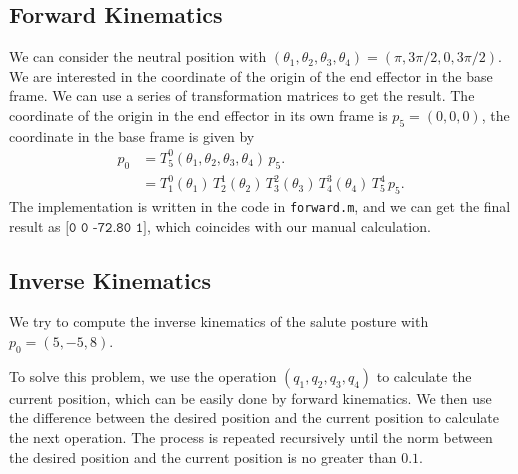 \documentclass[xcolor=x11names]{article}
\begin{document}
\subsection{Forward Kinematics}


   We can consider the neutral position with $(\theta_1,\theta_2,\theta_3, \theta_4) = (\pi, 3\pi/2,0,3\pi/2)$. We are interested in the coordinate of the origin of the end effector in the base frame. We can use a series of transformation matrices to get the result. The coordinate of the origin in the end effector in its own frame is $p_5 = (0,0,0)$, the coordinate in the base frame is given by
   \begin{align*}
      p_0 &= T_5^0(\theta_1, \theta_2, \theta_3, \theta_4) \, p_5. \\
          &= T_1^0(\theta_1) \, T_2^1(\theta_2) \, T_3^2(\theta_3) \, T_4^3(\theta_4) \, T_5^4 \, p_5.
   \end{align*}
The implementation is written in the code in \texttt{forward.m}, and we can get the final result as $\texttt{[0 0 -72.80 1]}$, which coincides with our manual calculation.

\subsection{Inverse Kinematics}


   We try to compute the inverse kinematics of the salute posture with $p_0 = (5, -5, 8)$.
   
   To solve this problem, we use the operation $(q_1,q_2,q_3,q_4)$ to calculate the current position, which can be easily done by forward kinematics. We then use the difference between the desired position and the current position to calculate the next operation. The process is repeated recursively until the norm between the desired position and the current position is no greater than $0.1$.
   
\end{document}
